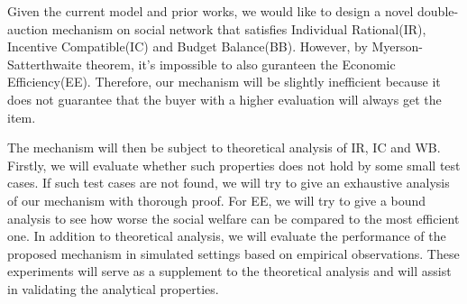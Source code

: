 Given the current model and prior works, we would like to design a novel double-auction mechanism
on social network that satisfies Individual Rational(IR), Incentive Compatible(IC) and Budget Balance(BB).
However, by Myerson-Satterthwaite theorem\cite{MYERSON1983265}, it's impossible to also guranteen the
Economic Efficiency(EE). Therefore, our mechanism will be slightly inefficient because it does not
guarantee that the buyer with a higher evaluation will always get the item.\par

The mechanism will then be subject to theoretical analysis of IR, IC and WB. Firstly, we will evaluate whether such properties does not hold by some small test cases. If such test cases are not found, we will try to give an exhaustive analysis of our mechanism with thorough proof. For EE, we will try to give a bound analysis to see how worse the social welfare can be compared to the most efficient one. In addition to theoretical analysis, we will evaluate the performance of the proposed mechanism in simulated settings based on empirical observations. These experiments will serve as a supplement to the theoretical analysis and will assist in validating the analytical properties.
